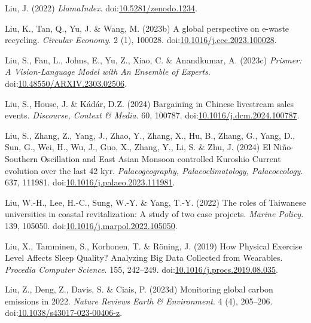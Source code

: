 \documentclass[
  letterpaper,
  DIV=11,
  numbers=noendperiod]{scrartcl}
\newlength{\cslhangindent}
\newenvironment{CSLReferences}[2] %
 {\begin{list}{}{%
  \setlength{\itemindent}{0pt}
  \setlength{\leftmargin}{0pt}
  \setlength{\parsep}{0pt}
  \ifodd #1
   \setlength{\leftmargin}{\cslhangindent}
   \setlength{\itemindent}{-1\cslhangindent}
  \fi
  \setlength{\itemsep}{#2\baselineskip}}}
 {\end{list}}
\begin{document}
\begin{CSLReferences}{0}{1}
Liu, J. (2022) \emph{{LlamaIndex}}.
doi:\href{https://doi.org/10.5281/zenodo.1234}{10.5281/zenodo.1234}.

Liu, K., Tan, Q., Yu, J. \& Wang, M. (2023b) A global perspective on
e-waste recycling. \emph{Circular Economy}. 2 (1), 100028.
doi:\href{https://doi.org/10.1016/j.cec.2023.100028}{10.1016/j.cec.2023.100028}.

Liu, S., Fan, L., Johns, E., Yu, Z., Xiao, C. \& Anandkumar, A. (2023c)
\emph{Prismer: {A Vision-Language Model} with {An Ensemble} of
{Experts}}.
doi:\href{https://doi.org/10.48550/ARXIV.2303.02506}{10.48550/ARXIV.2303.02506}.

Liu, S., House, J. \& Kádár, D.Z. (2024) Bargaining in {Chinese}
livestream sales events. \emph{Discourse, Context \& Media}. 60, 100787.
doi:\href{https://doi.org/10.1016/j.dcm.2024.100787}{10.1016/j.dcm.2024.100787}.

Liu, S., Zhang, Z., Yang, J., Zhao, Y., Zhang, X., Hu, B., Zhang, G.,
Yang, D., Sun, G., Wei, H., Wu, J., Guo, X., Zhang, Y., Li, S. \& Zhu,
J. (2024) El {Ni{ñ}o-Southern Oscillation} and {East Asian Monsoon}
controlled {Kuroshio Current} evolution over the last 42 kyr.
\emph{Palaeogeography, Palaeoclimatology, Palaeoecology}. 637, 111981.
doi:\href{https://doi.org/10.1016/j.palaeo.2023.111981}{10.1016/j.palaeo.2023.111981}.

Liu, W.-H., Lee, H.-C., Sung, W.-Y. \& Yang, T.-Y. (2022) The roles of
{Taiwanese} universities in coastal revitalization: {A} study of two
case projects. \emph{Marine Policy}. 139, 105050.
doi:\href{https://doi.org/10.1016/j.marpol.2022.105050}{10.1016/j.marpol.2022.105050}.

Liu, X., Tamminen, S., Korhonen, T. \& Röning, J. (2019) How {Physical
Exercise Level Affects Sleep Quality}? {Analyzing Big Data Collected}
from {Wearables}. \emph{Procedia Computer Science}. 155, 242--249.
doi:\href{https://doi.org/10.1016/j.procs.2019.08.035}{10.1016/j.procs.2019.08.035}.

Liu, Z., Deng, Z., Davis, S. \& Ciais, P. (2023d) Monitoring global
carbon emissions in 2022. \emph{Nature Reviews Earth \& Environment}. 4
(4), 205--206.
doi:\href{https://doi.org/10.1038/s43017-023-00406-z}{10.1038/s43017-023-00406-z}.


\end{CSLReferences}
\end{document}
